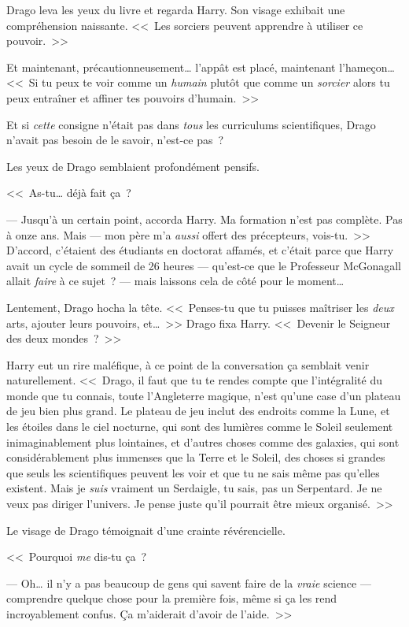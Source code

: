Drago leva les yeux du livre et regarda Harry. Son visage exhibait une compréhension naissante. <<~Les sorciers peuvent apprendre à utiliser ce pouvoir.~>>

Et maintenant, précautionneusement… l'appât est placé, maintenant l'hameçon… <<~Si tu peux te voir comme un \emph{humain} plutôt que comme un \emph{sorcier} alors tu peux entraîner et affiner tes pouvoirs d'humain.~>>

Et si \emph{cette} consigne n'était pas dans \emph{tous} les curriculums scientifiques, Drago n'avait pas besoin de le savoir, n'est-ce pas~?

Les yeux de Drago semblaient profondément pensifs.

<<~As-tu… déjà fait ça~?

--- Jusqu'à un certain point, accorda Harry. Ma formation n'est pas complète. Pas à onze ans. Mais — mon père m'a \emph{aussi} offert des précepteurs, vois-tu.~>> D'accord, c'étaient des étudiants en doctorat affamés, et c'était parce que Harry avait un cycle de sommeil de 26 heures — qu'est-ce que le Professeur McGonagall allait \emph{faire} à ce sujet~? — mais laissons cela de côté pour le moment…

Lentement, Drago hocha la tête. <<~Penses-tu que tu puisses maîtriser les \emph{deux} arts, ajouter leurs pouvoirs, et…~>> Drago fixa Harry. <<~Devenir le Seigneur des deux mondes~?~>>

Harry eut un rire maléfique, à ce point de la conversation ça semblait venir naturellement. <<~Drago, il faut que tu te rendes compte que l'intégralité du monde que tu connais, toute l'Angleterre magique, n'est qu'une case d'un plateau de jeu bien plus grand. Le plateau de jeu inclut des endroits comme la Lune, et les étoiles dans le ciel nocturne, qui sont des lumières comme le Soleil seulement inimaginablement plus lointaines, et d'autres choses comme des galaxies, qui sont considérablement plus immenses que la Terre et le Soleil, des choses si grandes que seuls les scientifiques peuvent les voir et que tu ne sais même pas qu'elles existent. Mais je \emph{suis} vraiment un Serdaigle, tu sais, pas un Serpentard. Je ne veux pas diriger l'univers. Je pense juste qu'il pourrait être mieux organisé.~>>

Le visage de Drago témoignait d'une crainte révérencielle.

<<~Pourquoi \emph{me} dis-tu ça~?

--- Oh… il n'y a pas beaucoup de gens qui savent faire de la \emph{vraie} science — comprendre quelque chose pour la première fois, même si ça les rend incroyablement confus. Ça m'aiderait d'avoir de l'aide.~>>

